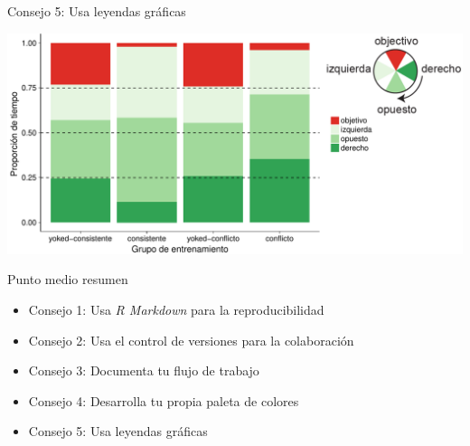 \documentclass[ignorenonframetext,]{beamer}
\providecommand{\tightlist}{%
  \setlength{\itemsep}{0pt}\setlength{\parskip}{0pt}}
\begin{document}
\begin{frame}{Consejo 5: Usa leyendas gráficas}

\includegraphics{../figures/10_talk/timespent-1.pdf}


\end{frame}

\begin{frame}{Punto medio resumen}

\begin{itemize}
\tightlist
\item
  Consejo 1: Usa \emph{R Markdown} para la reproducibilidad
\item
  Consejo 2: Usa el control de versiones para la colaboración
\item
  Consejo 3: Documenta tu flujo de trabajo
\item
  Consejo 4: Desarrolla tu propia paleta de colores
\item
  Consejo 5: Usa leyendas gráficas
\end{itemize}

\end{frame}
\end{document}

